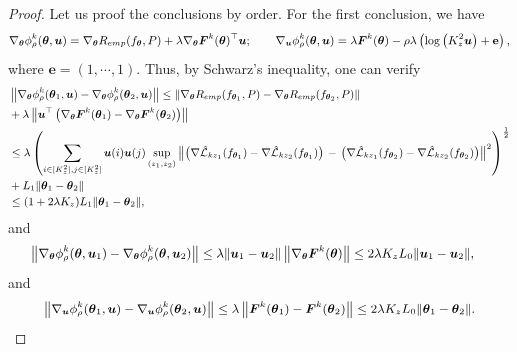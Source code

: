 \begin{proof}
	Let us proof the conclusions by order. For the first conclusion, we have 
	\begin{equation}
		\small
		\nabla_{\btheta}\phi^{k}_{\rho}(\btheta, \bu) = \nabla_{\btheta}R_{emp}(f_{\btheta}, P) + \lambda \nabla_{\btheta}\bF^{k}(\btheta)^{\top}\bu; \qquad \nabla_{\bu}\phi^{k}_{\rho}(\btheta, \bu) = \lambda \bF^{k}(\btheta) - \rho\lambda\left(\log{\left(K_{z}^{2}\bu\right)} + \textbf{e} \right),
	\end{equation}
	where $\textbf{e} = (1, \cdots, 1)$. Thus, by Schwarz's inequality, one can verify 
	\begin{equation}
		\small
		\begin{aligned}
			& \left\|\nabla_{\btheta}\phi_{\rho}^{k}(\btheta_{1}, \bu) - \nabla_{\btheta}\phi_{\rho}^{k}(\btheta_{2}, \bu)\right\|  \leq \|\nabla_{\btheta}R_{emp}(f_{\btheta_{1}}, P) - \nabla_{\btheta}R_{emp}(f_{\btheta_{2}}, P)\| \\
			& + \lambda\left\|\bu^{\top}\left(\nabla_{\btheta}\bF^{k}(\btheta_{1}) - \nabla_{\btheta}\bF^{k}(\btheta_{2})\right)\right\| \\
			& \leq \lambda \left(\sum\limits_{i\in[K_{z}^{2}],j\in[K_{z}^{2}]}\bu(i)\bu(j)\sup_{(z_{1}, z_{2})}\left\|\left(\nabla\hat{\cL}_{kz_{1}}(f_{\btheta_{1}}) -  \nabla\hat{\cL}_{kz_{2}}(f_{\btheta_{1}})\right)\right. - \left.\left(\nabla\hat{\cL}_{kz_{1}}(f_{\btheta_{2}}) -  \nabla\hat{\cL}_{kz_{2}}(f_{\btheta_{2}})\right)\right\|^{2}\right)^{\frac{1}{2}} \\
			& + L_{1}\|\btheta_{1} - \btheta_{2}\| \\
			& \leq (1 + 2\lambda K_{z})L_{1}\|\btheta_{1} - \btheta_{2}\|,
		\end{aligned}
	\end{equation}
	and
	\begin{equation}
		\small
		\begin{aligned}
			\left\|\nabla_{\btheta}\phi_{\rho}^{k}(\btheta, \bu_{1}) - \nabla_{\btheta}\phi_{\rho}^{k}(\btheta, \bu_{2})\right\| &\leq \lambda\|\bu_{1} - \bu_{2}\|\left\|\nabla_{\btheta}\bF^{k}(\btheta)\right\| \leq 2\lambda K_{z}L_{0}\|\bu_{1} - \bu_{2}\|,
		\end{aligned}
	\end{equation}
	and 
	\begin{equation}
		\small
		\begin{aligned}
			\left\|\nabla_{\bu}\phi_{\rho}^{k}(\btheta_{1}, \bu) - \nabla_{\bu}\phi_{\rho}^{k}(\btheta_{2}, \bu)\right\| \leq  \lambda\left\|\bF^{k}(\btheta_{1}) - \bF^{k}(\btheta_{2})\right\| \leq 2\lambda K_{z}L_{0}\|\btheta_{1} - \btheta_{2}\|.

\end{aligned}
\end{equation}
\end{proof}
